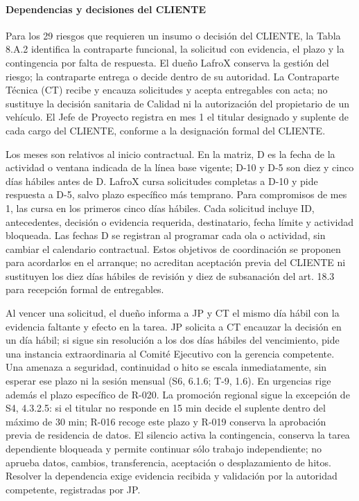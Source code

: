 \paragraph{Dependencias y decisiones del CLIENTE}
Para los 29 riesgos que requieren un insumo o decisión del CLIENTE, la Tabla 8.A.2 identifica la contraparte funcional, la solicitud con evidencia, el plazo y la contingencia por falta de respuesta. El dueño LafroX conserva la gestión del riesgo; la contraparte entrega o decide dentro de su autoridad. La Contraparte Técnica (CT) recibe y encauza solicitudes y acepta entregables con acta; no sustituye la decisión sanitaria de Calidad ni la autorización del propietario de un vehículo. El Jefe de Proyecto registra en mes 1 el titular designado y suplente de cada cargo del CLIENTE, conforme a la designación formal del CLIENTE.

Los meses son relativos al inicio contractual. En la matriz, D es la fecha de la actividad o ventana indicada de la línea base vigente; D-10 y D-5 son diez y cinco días hábiles antes de D. LafroX cursa solicitudes completas a D-10 y pide respuesta a D-5, salvo plazo específico más temprano. Para compromisos de mes 1, las cursa en los primeros cinco días hábiles. Cada solicitud incluye ID, antecedentes, decisión o evidencia requerida, destinatario, fecha límite y actividad bloqueada. Las fechas D se registran al programar cada ola o actividad, sin cambiar el calendario contractual. Estos objetivos de coordinación se proponen para acordarlos en el arranque; no acreditan aceptación previa del CLIENTE ni sustituyen los diez días hábiles de revisión y diez de subsanación del art. 18.3 para recepción formal de entregables.

Al vencer una solicitud, el dueño informa a JP y CT el mismo día hábil con la evidencia faltante y efecto en la tarea. JP solicita a CT encauzar la decisión en un día hábil; si sigue sin resolución a los dos días hábiles del vencimiento, pide una instancia extraordinaria al Comité Ejecutivo con la gerencia competente. Una amenaza a seguridad, continuidad o hito se escala inmediatamente, sin esperar ese plazo ni la sesión mensual (S6, 6.1.6; T-9, 1.6). En urgencias rige además el plazo específico de R-020. La promoción regional sigue la excepción de S4, 4.3.2.5: si el titular no responde en 15 min decide el suplente dentro del máximo de 30 min; R-016 recoge este plazo y R-019 conserva la aprobación previa de residencia de datos. El silencio activa la contingencia, conserva la tarea dependiente bloqueada y permite continuar sólo trabajo independiente; no aprueba datos, cambios, transferencia, aceptación o desplazamiento de hitos. Resolver la dependencia exige evidencia recibida y validación por la autoridad competente, registradas por JP.

